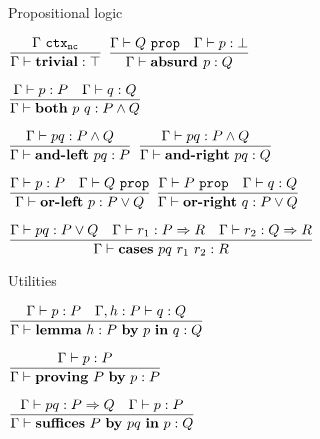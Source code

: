 \begin{frame}{Propositional logic}

\begin{center}
  $\infrule{\ctx[\noncomputable]{\Gamma}}{\proves[\Gamma]{\trueintro}{\True}}$ \quad
  $\infrule{\prop[\Gamma]{Q} \quad \proves[\Gamma]{p}{\False}}{\proves[\Gamma]{\falseelim{p}}{Q}}$

  \vspace{2em}

  $\infrule{\proves[\Gamma]{p}{P} \quad \proves[\Gamma]{q}{Q}}{\proves[\Gamma]{\andintro{p}{q}}{\And{P}{Q}}}$

  \vspace{1em}

  $\infrule{\proves[\Gamma]{pq}{\And{P}{Q}}}{\proves[\Gamma]{\andeliml{pq}}{P}}$ \quad
  $\infrule{\proves[\Gamma]{pq}{\And{P}{Q}}}{\proves[\Gamma]{\andelimr{pq}}{Q}}$

  \vspace{2em}

  $\infrule{\proves[\Gamma]{p}{P} \quad \prop[\Gamma]{Q}}{\proves[\Gamma]{\orintrol{p}}{\Or{P}{Q}}}$ \quad
  $\infrule{\prop[\Gamma]{P} \quad \proves[\Gamma]{q}{Q}}{\proves[\Gamma]{\orintror{q}}{\Or{P}{Q}}}$

  \vspace{1em}

  $\infrule{\proves[\Gamma]{pq}{\Or{P}{Q}} \quad \proves[\Gamma]{r_1}{\Impl{P}{R}} \quad \proves[\Gamma]{r_2}{\Impl{Q}{R}}}{\proves[\Gamma]{\orelim{pq}{r_1}{r_2}}{R}}$
\end{center}

\end{frame}

\begin{frame}{Utilities}

\begin{center}
  $\infrule{\proves[\Gamma]{p}{P} \quad \proves[\assume{\Gamma}{h}{P}]{q}{Q}}{\proves[\Gamma]{\lemma{h}{P}{p}{q}}{Q}}$

  \vspace{2em}

  $\infrule{\proves[\Gamma]{p}{P}}{\proves[\Gamma]{\proving{P}{p}}{P}}$

  \vspace{2em}

  $\infrule{\proves[\Gamma]{pq}{\Impl{P}{Q}} \quad \proves[\Gamma]{p}{P}}{\proves[\Gamma]{\suffices{P}{pq}{p}}{Q}}$

\end{center}

\end{frame}

